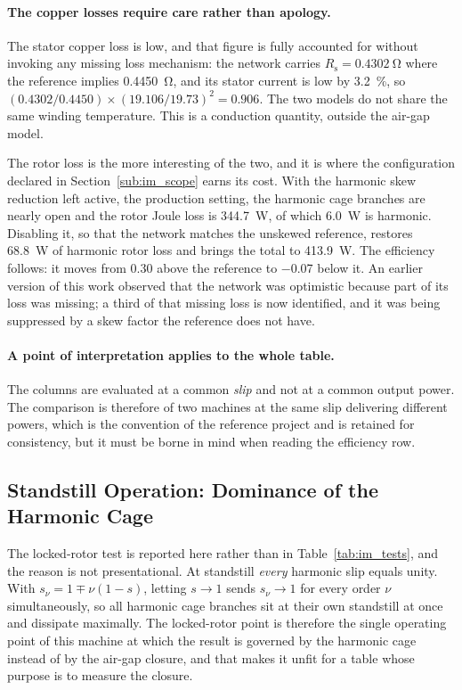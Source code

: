 \documentclass[10pt,a4paper,twocolumn]{article}
\theoremstyle{plain}
\theoremstyle{remark}
\begin{document}
\paragraph{The copper losses require care rather than apology.}
The stator copper loss is low, and that figure is fully accounted for
without invoking any missing loss mechanism: the network carries
$R_{\mathrm{s}}=\SI{0.4302}{\ohm}$ where the reference implies
\SI{0.4450}{\ohm}, and its stator current is low by
\SI{3.2}{\percent}, so
$(0.4302/0.4450)\times(19.106/19.73)^2=\num{0.906}$. The two models do
not share the same winding temperature. This is a conduction quantity,
outside the air-gap model.

The rotor loss is the more interesting of the two, and it is where the
configuration declared in Section~\ref{sub:im_scope} earns its cost.
With the harmonic skew reduction left active, the production
setting, the harmonic cage branches are nearly open and the rotor
Joule loss is \SI{344.7}{\watt}, of which \SI{6.0}{\watt} is harmonic.
Disabling it, so that the network matches the unskewed reference,
restores \SI{68.8}{\watt} of harmonic rotor loss and brings the total to
\SI{413.9}{\watt}. The efficiency follows: it moves from
\SI{+0.30}{\pp} above the reference to \SI{-0.07}{\pp} below it. An
earlier version of this work observed that the network was optimistic
because part of its loss was missing; a third of that missing loss is
now identified, and it was being suppressed by a skew factor the
reference does not have.

\paragraph{A point of interpretation applies to the whole table.}
The columns are evaluated at a common \emph{slip} and not at a common
output power. The comparison is therefore of two machines at the same
slip delivering different powers, which is the convention of the
reference project and is retained for consistency, but it must be borne
in mind when reading the efficiency row.


\subsection{Standstill Operation: Dominance of the Harmonic Cage}
\label{sub:standstill}

The locked-rotor test is reported here rather than in
Table~\ref{tab:im_tests}, and the reason is not presentational. At
standstill \emph{every} harmonic slip equals unity. With
$s_\nu=1\mp\nu(1-s)$, letting $s\to1$ sends $s_\nu\to1$ for every order
$\nu$ simultaneously, so all harmonic cage branches sit at their own
standstill at once and dissipate maximally. The locked-rotor point is
therefore the single operating point of this machine at which the
result is governed by the harmonic cage instead of by the air-gap
closure, and that makes it unfit for a table whose purpose is to measure
the closure.
\end{document}

